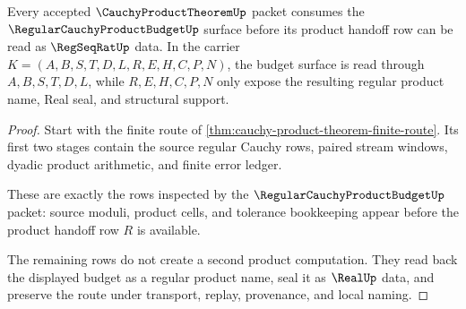 \begin{theorem}
\label{thm:cauchy-product-theorem-budget-support}
Every accepted $\CauchyProductTheoremUp$ packet consumes the $\RegularCauchyProductBudgetUp$ surface before its product handoff row can be read as $\RegSeqRatUp$ data. In the carrier $K=(A,B,S,T,D,L,R,E,H,C,P,N)$, the budget surface is read through $A,B,S,T,D,L$, while $R,E,H,C,P,N$ only expose the resulting regular product name, Real seal, and structural support.
\end{theorem}
\begin{proof}
Start with the finite route of \autoref{thm:cauchy-product-theorem-finite-route}. Its first two stages contain the source regular Cauchy rows, paired stream windows, dyadic product arithmetic, and finite error ledger.

These are exactly the rows inspected by the $\RegularCauchyProductBudgetUp$ packet: source moduli, product cells, and tolerance bookkeeping appear before the product handoff row $R$ is available.

The remaining rows do not create a second product computation. They read back the displayed budget as a regular product name, seal it as $\RealUp$ data, and preserve the route under transport, replay, provenance, and local naming.
\end{proof}




